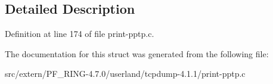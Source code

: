 \subsection{Detailed Description}


Definition at line 174 of file print-\/pptp.c.



The documentation for this struct was generated from the following file:\begin{DoxyCompactItemize}
\item 
src/extern/PF\_\-RING-\/4.7.0/userland/tcpdump-\/4.1.1/print-\/pptp.c\end{DoxyCompactItemize}
